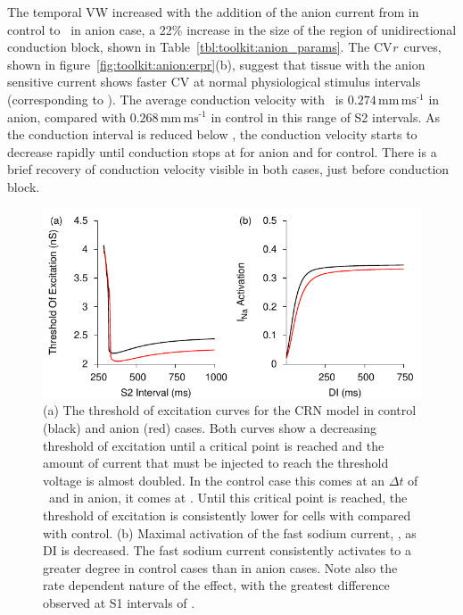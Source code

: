 The temporal VW increased with the addition of the anion current from 
in control to \ in anion case, a 22\% increase in the size of the
region of unidirectional conduction block, shown in
Table~\ref{tbl:toolkit:anion_params}.
The CV\emph{r}\ curves, shown in
figure~\ref{fig:toolkit:anion:erpr}(b), suggest that tissue with the anion sensitive current
shows faster CV at normal physiological stimulus intervals (corresponding to
).
The average conduction velocity with \ is
$0.274\,\text{mm}\,\text{ms}^{\text{-1}}$ in anion,
compared with $0.268\,\text{mm}\,\text{ms}^{\text{-1}}$ in control in this range
of S2 intervals.
As the conduction interval is reduced below , the conduction velocity
starts to decrease rapidly until conduction stops at  for anion and
 for control.
There is a brief recovery of conduction velocity visible in both cases, just
before conduction block.

\begin{figure}
\begin{center}
\includegraphics{figures/toolkit/anion/figures/04_ToE}
\end{center}
\caption[Anion Sensitive Threshold Of Excitation and  activation]{
\label{fig:toolkit:anion:toe}
(a)
The threshold of excitation curves for the CRN model in control (black) and
anion (red) cases.
Both curves show a decreasing threshold of excitation until a critical point is
reached and the amount of current that must be injected to reach the threshold
voltage is almost doubled.  In the control case this comes at an $\Delta t$ of
\ and in anion, it comes at .
Until this critical point is reached, the threshold of excitation is
consistently lower for cells with  compared with control.
(b)
Maximal activation of the fast sodium current, , as DI is decreased.
The fast sodium current consistently activates to a greater degree in control
cases than in anion cases.
Note also the rate
dependent nature of the effect, with the greatest difference observed at S1
intervals of .
}
\end{figure}


